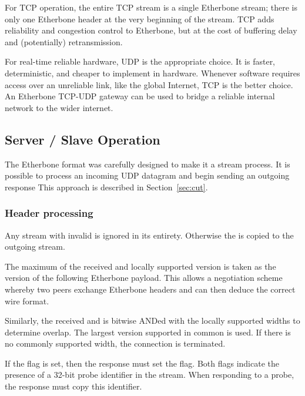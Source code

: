 \documentclass{article}
\begin{document}
For TCP operation,
the entire TCP stream is a single Etherbone stream;
there is only one Etherbone header at the very beginning of the stream.
TCP adds reliability and congestion control to Etherbone,
but at the cost of buffering delay
and (potentially) retransmission.

For real-time reliable hardware, UDP is the appropriate choice.
It is faster, deterministic, and cheaper to implement in hardware.
Whenever software requires access over an unreliable link,
like the global Internet,
TCP is the better choice.
An Etherbone TCP-UDP gateway can be used
to bridge a reliable internal network to the wider internet.

\subsection{Server / Slave Operation}

The Etherbone format was carefully designed to make it a stream process.
It is possible to process an incoming UDP datagram and
begin sending an outgoing response 
This approach is described in Section~\ref{sec:cut}.

\subsubsection{Header processing}


Any stream with invalid  is ignored in its entirety.
Otherwise the  is copied to the outgoing stream.

The maximum of the received  and 
locally supported version is taken
as the version of the following Etherbone payload.
This allows a negotiation scheme whereby two peers
exchange Etherbone headers and can then deduce the correct wire format.

Similarly, 
the received  and 
is bitwise ANDed with the locally supported widths to determine overlap.
The largest version supported in common is used.
If there is no commonly supported width, 
the connection is terminated.

If the  flag is set,
then the response must set the  flag.
Both flags indicate the presence of a 32-bit probe identifier in the stream.
When responding to a probe, 
the response must copy this identifier.
\end{document}
